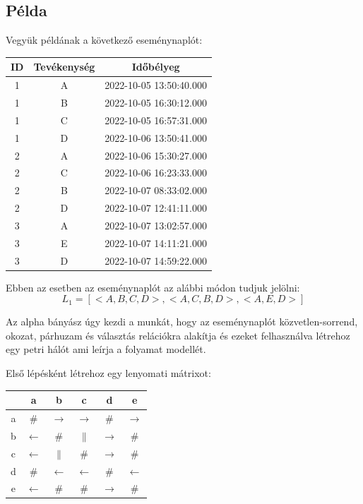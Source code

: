 \subsection{Példa}
Vegyük példának a következő eseménynaplót:\\
\begin{center}
\begin{tabular}{||c | c | c ||}
	\hline
	ID & Tevékenység & Időbélyeg \\ [0.5ex]
	\hline\hline
	1 & A & 2022-10-05 13:50:40.000 \\
	\hline
	1 & B & 2022-10-05 16:30:12.000 \\
	\hline
	1 & C & 2022-10-05 16:57:31.000 \\
	\hline
	1 & D & 2022-10-06 13:50:41.000 \\
	\hline
	2 & A & 2022-10-06 15:30:27.000 \\
	\hline
	2 & C & 2022-10-06 16:23:33.000 \\
	\hline
	2 & B & 2022-10-07 08:33:02.000 \\
	\hline
	2 & D & 2022-10-07 12:41:11.000 \\
	\hline
	3 & A & 2022-10-07 13:02:57.000 \\
	\hline
	3 & E & 2022-10-07 14:11:21.000 \\
	\hline
	3 & D & 2022-10-07 14:59:22.000 \\
	\hline
\end{tabular}
\end{center}
Ebben az esetben az eseménynaplót az alábbi módon tudjuk jelölni:
\[ 
	L_1 = [< A,B,C,D >, <A,C,B,D>, <A,E,D>]
\]

Az alpha bányász úgy kezdi a munkát, hogy az eseménynaplót közvetlen-sorrend, okozat, párhuzam és választás relációkra alakítja és ezeket felhasználva létrehoz egy petri hálót ami leírja a folyamat modellét.

Első lépésként létrehoz egy lenyomati mátrixot:

\begin{center}
\begin{tabular}{|c | c | c | c | c | c|}
	\hline
	\hspace{0.1cm} & a & b & c & d & e \\
	\hline
	a & \# & $\rightarrow$ & $\rightarrow$ & \# & $\rightarrow$ \\
	\hline
	b & $\leftarrow$ & \# & $\parallel$ & $\rightarrow$ & \# \\
	\hline
	c & $\leftarrow$ & $\parallel$ & \# & $\rightarrow$ & \# \\
	\hline
	d  & \# & $\leftarrow$ & $\leftarrow$ & \# & $\leftarrow$ \\
	\hline
	e & $\leftarrow$ & \# & \# & $\rightarrow$ & \# \\
	\hline
\end{tabular}
\end{center}

